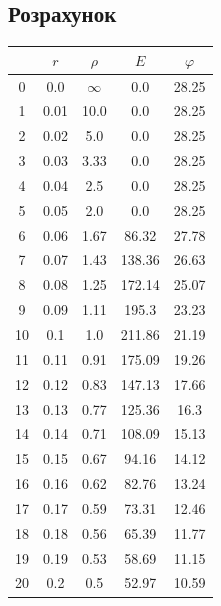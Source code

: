 \documentclass[a4paper,12pt]{article}
\begin{document}
\begin{justify}
 \section{Розрахунок}
 \begin{table}[htp]\centering
\begin{tabular}{|c|c|c|c|c|}
\hline
   & $r$  & $\rho$   & $E$    & $\varphi$ \\ \hline
0  & 0.0  & $\infty$ & 0.0    & 28.25     \\ \hline
1  & 0.01 & 10.0     & 0.0    & 28.25     \\ \hline
2  & 0.02 & 5.0      & 0.0    & 28.25     \\ \hline
3  & 0.03 & 3.33     & 0.0    & 28.25     \\ \hline
4  & 0.04 & 2.5      & 0.0    & 28.25     \\ \hline
5  & 0.05 & 2.0      & 0.0    & 28.25     \\ \hline
6  & 0.06 & 1.67     & 86.32  & 27.78     \\ \hline
7  & 0.07 & 1.43     & 138.36 & 26.63     \\ \hline
8  & 0.08 & 1.25     & 172.14 & 25.07     \\ \hline
9  & 0.09 & 1.11     & 195.3  & 23.23     \\ \hline
10 & 0.1  & 1.0      & 211.86 & 21.19     \\ \hline
11 & 0.11 & 0.91     & 175.09 & 19.26     \\ \hline
12 & 0.12 & 0.83     & 147.13 & 17.66     \\ \hline
13 & 0.13 & 0.77     & 125.36 & 16.3      \\ \hline
14 & 0.14 & 0.71     & 108.09 & 15.13     \\ \hline
15 & 0.15 & 0.67     & 94.16  & 14.12     \\ \hline
16 & 0.16 & 0.62     & 82.76  & 13.24     \\ \hline
17 & 0.17 & 0.59     & 73.31  & 12.46     \\ \hline
18 & 0.18 & 0.56     & 65.39  & 11.77     \\ \hline
19 & 0.19 & 0.53     & 58.69  & 11.15     \\ \hline
20 & 0.2  & 0.5      & 52.97  & 10.59     \\ \hline
\end{tabular}
\end{table}

\end{justify}
\end{document}
